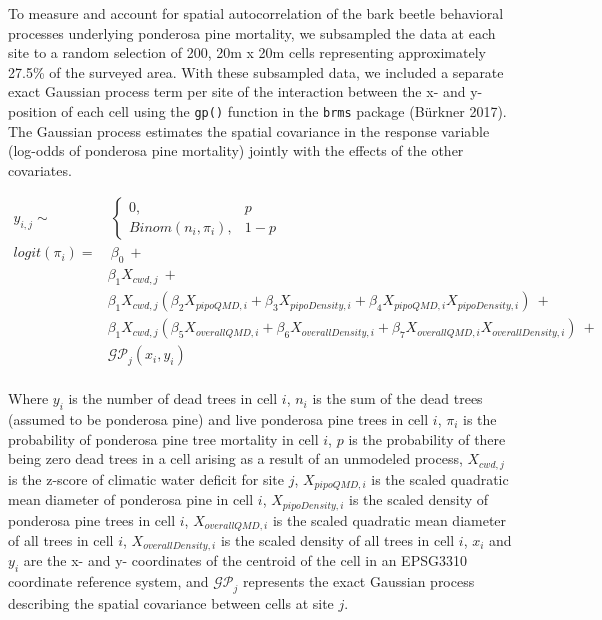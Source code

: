 \documentclass[]{article}
\begin{document}
To measure and account for spatial autocorrelation of the bark beetle
behavioral processes underlying ponderosa pine mortality, we subsampled
the data at each site to a random selection of 200, 20m x 20m cells
representing approximately 27.5\% of the surveyed area. With these
subsampled data, we included a separate exact Gaussian process term per
site of the interaction between the x- and y-position of each cell using
the \texttt{gp()} function in the \texttt{brms} package (Bürkner 2017).
The Gaussian process estimates the spatial covariance in the response
variable (log-odds of ponderosa pine mortality) jointly with the effects
of the other covariates.

\[
\begin{aligned}
y_{i,j} \sim &\ \begin{cases}
0, & p \\
Binom(n_i, \pi_i), & 1-p
\end{cases} \\
logit(\pi_i) = &\ \beta_0\ + \\
& \beta_1X_{cwd, j}\ + \\
& \beta_1X_{cwd, j}(\beta_2X_{pipoQMD, i} + \beta_3X_{pipoDensity, i} + \beta_4X_{pipoQMD, i}X_{pipoDensity, i})\ + \\ 
& \beta_1X_{cwd, j}(\beta_5X_{overallQMD, i} + \beta_6X_{overallDensity, i} + \beta_7X_{overallQMD, i}X_{overallDensity, i})\ + \\
& \mathcal{GP}_j(x_i, y_i) \\
\end{aligned}
\]

Where \(y_i\) is the number of dead trees in cell \(i\), \(n_i\) is the
sum of the dead trees (assumed to be ponderosa pine) and live ponderosa
pine trees in cell \(i\), \(\pi_i\) is the probability of ponderosa pine
tree mortality in cell \(i\), \(p\) is the probability of there being
zero dead trees in a cell arising as a result of an unmodeled process,
\(X_{cwd, j}\) is the z-score of climatic water deficit for site \(j\),
\(X_{pipoQMD, i}\) is the scaled quadratic mean diameter of ponderosa
pine in cell \(i\), \(X_{pipoDensity, i}\) is the scaled density of
ponderosa pine trees in cell \(i\), \(X_{overallQMD, i}\) is the scaled
quadratic mean diameter of all trees in cell \(i\),
\(X_{overallDensity, i}\) is the scaled density of all trees in cell
\(i\), \(x_i\) and \(y_i\) are the x- and y- coordinates of the centroid
of the cell in an EPSG3310 coordinate reference system, and
\(\mathcal{GP}_j\) represents the exact Gaussian process describing the
spatial covariance between cells at site \(j\).
\end{document}
